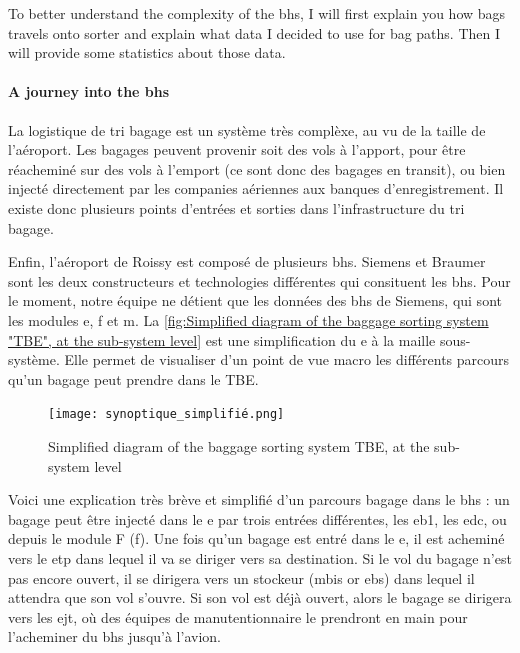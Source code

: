 \documentclass[12pt]{article}
\begin{document}
To better understand the complexity of the \acrshort{bhs}, I will first explain you how bags travels onto sorter and explain what data I decided to use for bag paths. Then I will provide some statistics about those data.

\paragraph{A journey into the \acrshort{bhs}} La logistique de tri bagage est un système très complèxe, au vu de la taille de l'aéroport. Les bagages peuvent provenir soit des vols à l'apport, pour être réacheminé sur des vols à l'emport (ce sont donc des bagages en transit), ou bien injecté directement par les companies aériennes aux banques d'enregistrement. Il existe donc plusieurs points d'entrées et sorties dans l'infrastructure du tri bagage.

Enfin, l'aéroport de Roissy est composé de plusieurs \acrlong{bhs}. Siemens et Braumer sont les deux constructeurs et technologies différentes qui consituent les \acrshort{bhs}. Pour le moment, notre équipe ne détient que les données des \acrshort{bhs} de Siemens, qui sont les modules \acrshort{e}, \acrshort{f} et \acrshort{m}. La \autoref{fig:Simplified diagram of the baggage sorting system "TBE", at the sub-system level} est une simplification du \acrshort{e} à la maille sous-système. Elle permet de visualiser d'un point de vue macro les différents parcours qu'un bagage peut prendre dans le TBE.


\begin{figure}[h]
    \texttt{[image: synoptique\_simplifié.png]}\\
    \caption{Simplified diagram of the baggage sorting system TBE, at the sub-system level}
    \label{fig:Simplified diagram of the baggage sorting system "TBE", at the sub-system level}
\end{figure}
\FloatBarrier
Voici une explication très brève et simplifié d'un parcours bagage dans le \acrshort{bhs} : un bagage peut être injecté dans le \acrshort{e} par trois entrées différentes, les \acrlong{eb1}, les \acrlong{edc}, ou depuis le module F (\acrshort{f}). Une fois qu'un bagage est entré dans le \acrshort{e}, il est acheminé vers le \acrshort{etp} dans lequel il va se diriger vers sa destination. Si le vol du bagage n'est pas encore ouvert, il se dirigera vers un stockeur (\acrshort{mbis} or \acrshort{ebs}) dans lequel il attendra que son vol s'ouvre. Si son vol est déjà ouvert, alors le bagage se dirigera vers les \acrshort{ejt}, où des équipes de manutentionnaire le prendront en main pour l'acheminer du \acrshort{bhs} jusqu'à l'avion.
\end{document}
